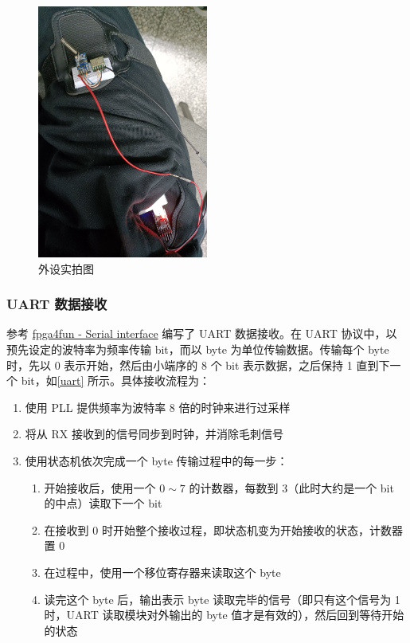 \documentclass[UTF8, 11pt, fontset=none]{ctexart}
\begin{document}
\begin{figure}[ht]
    \centering
    \includegraphics[width=0.5\textwidth]{images/sensor.jpg}
    \caption{外设实拍图}
    \label{sensor}
\end{figure}

\subsubsection{UART 数据接收}

参考 \href{https://www.fpga4fun.com/SerialInterface.html}{fpga4fun - Serial interface} 编写了 UART 数据接收。在 UART 协议中，以预先设定的波特率为频率传输 bit，而以 byte 为单位传输数据。传输每个 byte 时，先以 0 表示开始，然后由小端序的 8 个 bit 表示数据，之后保持 1 直到下一个 bit，如\cref{uart} 所示。具体接收流程为：

\begin{enumerate}
    \item 使用 PLL 提供频率为波特率 8 倍的时钟来进行过采样
    \item 将从 RX 接收到的信号同步到时钟，并消除毛刺信号
    \item 使用状态机依次完成一个 byte 传输过程中的每一步：
        \begin{enumerate}
            \item 开始接收后，使用一个 $0 \sim 7$ 的计数器，每数到 3（此时大约是一个 bit 的中点）读取下一个 bit
            \item 在接收到 0 时开始整个接收过程，即状态机变为开始接收的状态，计数器置 0
            \item 在过程中，使用一个移位寄存器来读取这个 byte
            \item 读完这个 byte 后，输出表示 byte 读取完毕的信号（即只有这个信号为 1 时，UART 读取模块对外输出的 byte 值才是有效的），然后回到等待开始的状态
        \end{enumerate}
\end{enumerate}
\end{document}
